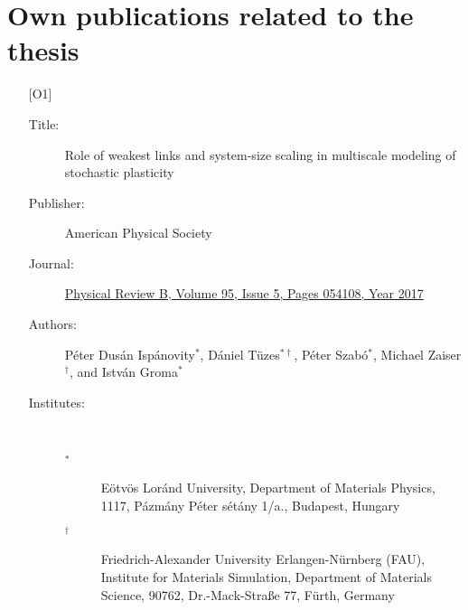 \chapter{Own publications related to the thesis} \label{chapter:publications}

\ifpdf
    \graphicspath{{Chapter7/Figs/Raster/}{Chapter7/Figs/PDF/}{Chapter7/Figs/}}
\else
    \graphicspath{{Chapter7/Figs/Vector/}{Chapter7/Figs/}}
\fi

\begin{itemize}
\item [{[O1]}]

\begin{description}
\item [Title:] Role of weakest links and system-size scaling in multiscale modeling of stochastic plasticity
\item [Publisher:] American Physical Society
\item [Journal:] \href{https://doi.org/10.1103/PhysRevB.95.054108}{Physical Review B, Volume 95, Issue 5, Pages 054108, Year 2017}
\item [Authors:] Péter Dusán Ispánovity$^*$, Dániel Tüzes$^{* \dagger}$, Péter Szabó$^*$, Michael Zaiser$^\dagger$, and István Groma$^*$
\item [Institutes:]~
\begin{description}
\item [$^*$] Eötvös Loránd University, Department of Materials Physics, 1117, Pázmány Péter sétány 1/a., Budapest, Hungary
\item [$^\dagger$] Friedrich-Alexander University Erlangen-Nürnberg (FAU), Institute for Materials Simulation, Department of Materials Science, 90762, Dr.-Mack-Straße 77, Fürth, Germany
\end{description}
\end{description}\label{paper:A2}

\pagebreak


\end{itemize}

